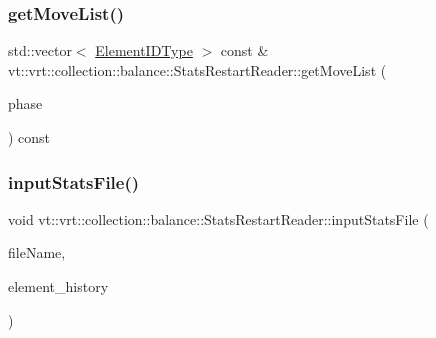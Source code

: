 \subsubsection{\texorpdfstring{get\+Move\+List()}{getMoveList()}}
{\footnotesize\ttfamily std\+::vector$<$ \hyperlink{namespacevt_1_1vrt_1_1collection_1_1balance_a14c8d2c972f2913aa3f1636e5be0a120}{Element\+I\+D\+Type} $>$ const  \& vt\+::vrt\+::collection\+::balance\+::\+Stats\+Restart\+Reader\+::get\+Move\+List (\begin{DoxyParamCaption}\item[{\hyperlink{namespacevt_a46ce6733d5cdbd735d561b7b4029f6d7}{Phase\+Type}}]{phase }\end{DoxyParamCaption}) const}

\mbox{\label{structvt_1_1vrt_1_1collection_1_1balance_1_1_stats_restart_reader_af2ef6b8e0e99d04ed21b6fa378819a2f}} 
\subsubsection{\texorpdfstring{input\+Stats\+File()}{inputStatsFile()}}
{\footnotesize\ttfamily void vt\+::vrt\+::collection\+::balance\+::\+Stats\+Restart\+Reader\+::input\+Stats\+File (\begin{DoxyParamCaption}\item[{std\+::string const \&}]{file\+Name,  }\item[{std\+::deque$<$ std\+::set$<$ \hyperlink{namespacevt_1_1vrt_1_1collection_1_1balance_a14c8d2c972f2913aa3f1636e5be0a120}{Element\+I\+D\+Type} $>$$>$ \&}]{element\+\_\+history }\end{DoxyParamCaption})\hspace{0.3cm}{\ttfamily [private]}}

\mbox{\label{structvt_1_1vrt_1_1collection_1_1balance_1_1_stats_restart_reader_abb3373c0dd6e58b2089d9587cba71825}} 
